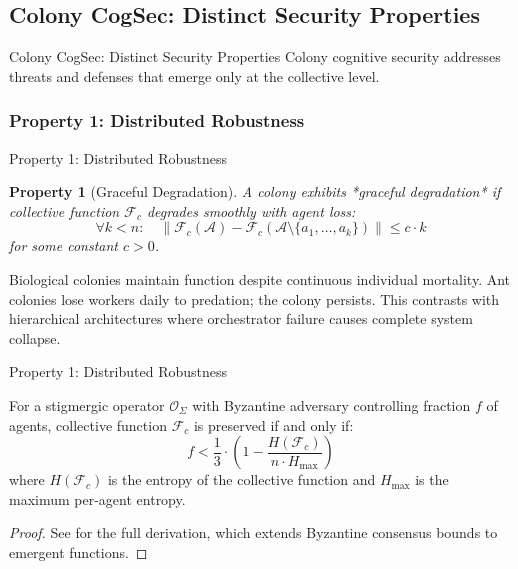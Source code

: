\documentclass[
  ignorenonframetext,
]{beamer}
\providecommand{\cref}[1]{\texttt{\detokenize{#1}}}
\newtheorem{property}{Property}
\begin{document}
\subsection{Colony CogSec: Distinct Security
Properties}\label{sec:colony-properties}

\begin{frame}[allowframebreaks]{Colony CogSec: Distinct Security
Properties}
Colony cognitive security addresses threats and defenses that emerge
only at the collective level.
\end{frame}

\subsubsection{Property 1: Distributed
Robustness}\label{sec:distributed-robustness}

\begin{frame}[allowframebreaks]{Property 1: Distributed Robustness}
\begin{property}[Graceful Degradation]
\label{prop:graceful-degradation}
A colony exhibits *graceful degradation* if collective function $\mathcal{F}_c$ degrades smoothly with agent loss:
\begin{equation}
\label{eq:graceful-degradation}
\forall k < n: \quad \left\| \mathcal{F}_c(\mathcal{A}) - \mathcal{F}_c(\mathcal{A} \setminus \{a_1, \ldots, a_k\}) \right\| \leq c \cdot k
\end{equation}
for some constant $c > 0$.
\end{property}

Biological colonies maintain function despite continuous individual
mortality. Ant colonies lose workers daily to predation; the colony
persists. This contrasts with hierarchical architectures where
orchestrator failure causes complete system collapse.

\end{frame}

\begin{frame}[allowframebreaks]{Property 1: Distributed Robustness}
\begin{theorem}
\label{thm:redundancy-resilience}
For a stigmergic operator $\mathcal{O}_\Sigma$ with Byzantine adversary controlling fraction $f$ of agents, collective function $\mathcal{F}_c$ is preserved if and only if:
\begin{equation}
\label{eq:redundancy-condition}
f < \frac{1}{3} \cdot \left(1 - \frac{H(\mathcal{F}_c)}{n \cdot H_{\max}}\right)
\end{equation}
where $H(\mathcal{F}_c)$ is the entropy of the collective function and $H_{\max}$ is the maximum per-agent entropy.
\end{theorem}

\begin{proof}
See \cref{sec:proof-redundancy-resilience} for the full derivation, which extends Byzantine consensus bounds to emergent functions.
\end{proof}
\end{frame}
\end{document}
